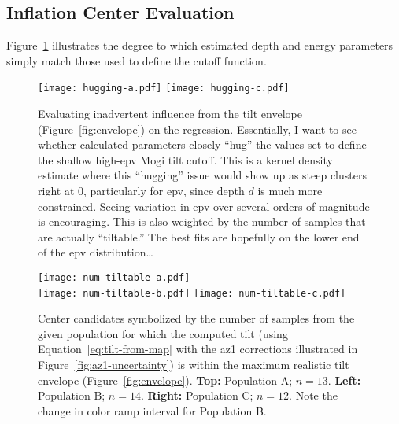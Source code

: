\subsection{Inflation Center Evaluation}

Figure~\ref{fig:cutoff} illustrates the degree to which estimated depth and energy parameters simply match those used to define the cutoff function.

\begin{figure}
    \texttt{[image: hugging-a.pdf]}
    \texttt{[image: hugging-c.pdf]}
    \caption[Check for envelope ``hugging'']{Evaluating inadvertent influence from the tilt envelope (Figure~\ref{fig:envelope}) on the regression. Essentially, I want to see whether calculated parameters closely ``hug'' the values set to define the shallow high-\acs{epv} Mogi tilt cutoff. This is a kernel density estimate where this ``hugging'' issue would show up as steep clusters right at 0, particularly for \acs{epv}, since depth $d$ is much more constrained. Seeing variation in \acs{epv} over several orders of magnitude is encouraging. This is also weighted by the number of samples that are actually ``tiltable.'' The best fits are hopefully on the lower end of the \acs{epv} distribution\dots} 
    \label{fig:cutoff}
\end{figure}

 \begin{figure}
    \begin{center}
     \texttt{[image: num-tiltable-a.pdf]}\\
     \texttt{[image: num-tiltable-b.pdf]}%
     \texttt{[image: num-tiltable-c.pdf]}
     \caption[Inflation Center Candidates by number of ``tiltable'' samples]{Center candidates symbolized by the number of samples from the given population for which the computed tilt (using Equation~\eqref{eq:tilt-from-map} with the \acs{az1} corrections illustrated in Figure~\ref{fig:az1-uncertainty}) is within the maximum realistic tilt envelope (Figure~\ref{fig:envelope}). \textbf{Top:} Population A; $n=13$. \textbf{Left:} Population B; $n=14$. \textbf{Right:} Population C; $n=12$. Note the change in color ramp interval for Population B.} 
     \label{fig:num-tiltable}
    \end{center}
\end{figure}

